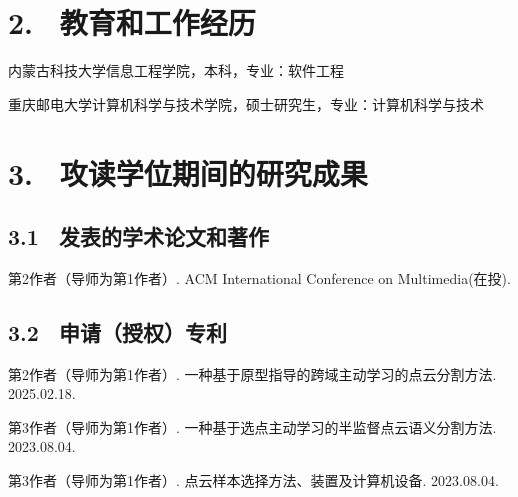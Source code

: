 \section{2. \ 教育和工作经历}
\begin{description}[leftmargin=3.5cm, style=sameline]
\item[2017.09$\sim$2021.07] 内蒙古科技大学信息工程学院，本科，专业：软件工程
\item[2022.09$\sim$2025.06] 重庆邮电大学计算机科学与技术学院，硕士研究生，专业：计算机科学与技术
\end{description}


\section{3. \ 攻读学位期间的研究成果}

\subsection{3.1 \ 发表的学术论文和著作}
\noindent [1]
\begin{minipage}[t]{0.96\linewidth}
第2作者（导师为第1作者）. ACM International Conference on Multimedia(在投).
\end{minipage}
\vspace{0cm}

\subsection{3.2 \ 申请（授权）专利}
\noindent [1]
\begin{minipage}[t]{0.96\linewidth}
第2作者（导师为第1作者）. 一种基于原型指导的跨域主动学习的点云分割方法. 2025.02.18.
\end{minipage}
\noindent [2]
\begin{minipage}[t]{0.96\linewidth}
第3作者（导师为第1作者）. 一种基于选点主动学习的半监督点云语义分割方法. 2023.08.04.
\end{minipage}
\noindent [3]
\begin{minipage}[t]{0.96\linewidth}
第3作者（导师为第1作者）. 点云样本选择方法、装置及计算机设备. 2023.08.04.
\end{minipage}

